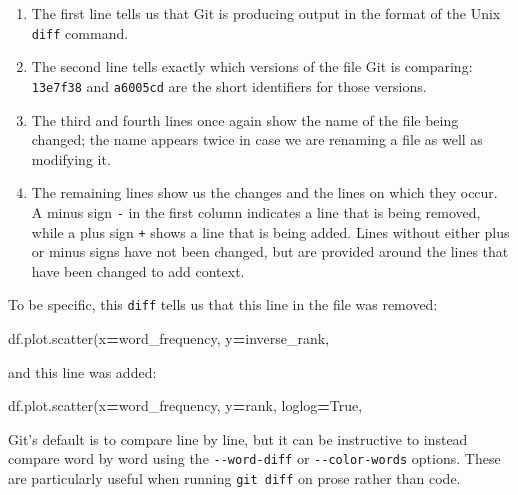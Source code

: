 \documentclass[
]{krantz}
\makeatletter
\newenvironment{Shaded}{\begin{snugshade}}{\end{snugshade}}
\newcommand{\NormalTok}[1]{#1}
\newcommand{\OperatorTok}[1]{\textcolor[rgb]{0.81,0.36,0.00}{\textbf{#1}}}
\newcommand{\StringTok}[1]{\textcolor[rgb]{0.31,0.60,0.02}{#1}}
\newcommand{\VariableTok}[1]{\textcolor[rgb]{0.00,0.00,0.00}{#1}}
\providecommand{\tightlist}{%
  \setlength{\itemsep}{0pt}\setlength{\parskip}{0pt}}
\newenvironment{kframe}{%
\medskip{}
\setlength{\fboxsep}{.8em}
 \def\at@end@of@kframe{}%
 \ifinner\ifhmode%
  \def\at@end@of@kframe{\end{minipage}}%
  \begin{minipage}{\columnwidth}%
 \fi\fi%
 \def\FrameCommand##1{\hskip\@totalleftmargin \hskip-\fboxsep
 \colorbox{shadecolor}{##1}\hskip-\fboxsep
     \hskip-\linewidth \hskip-\@totalleftmargin \hskip\columnwidth}%
 \MakeFramed {\advance\hsize-\width
   \@totalleftmargin\z@ \linewidth\hsize
   \@setminipage}}%
 {\par\unskip\endMakeFramed%
 \at@end@of@kframe}
\renewenvironment{Shaded}{\begin{kframe}}{\end{kframe}}
\makeatother
\begin{document}
\begin{enumerate}
\def\labelenumi{\arabic{enumi}.}
\tightlist
\item
  The first line tells us that Git is producing output
  in the format of the Unix \texttt{diff} command.
\item
  The second line tells exactly which versions of the file Git is comparing:
  \texttt{13e7f38} and \texttt{a6005cd} are the short identifiers for those versions.
\item
  The third and fourth lines once again show the name of the file being changed;
  the name appears twice in case we are renaming a file as well as modifying it.
\item
  The remaining lines show us the changes and the lines on which they occur.
  A minus sign \texttt{-} in the first column indicates a line that is being removed,
  while a plus sign \texttt{+} shows a line that is being added. Lines without either
  plus or minus signs have not been changed, but are provided around the lines
  that have been changed to add context.
\end{enumerate}

To be specific,
this \texttt{diff} tells us that this line in the file was removed:

\begin{Shaded}
\begin{Highlighting}[]
\NormalTok{    df.plot.scatter(x}\OperatorTok{=}\StringTok{\textquotesingle{}word\_frequency\textquotesingle{}}\NormalTok{, y}\OperatorTok{=}\StringTok{\textquotesingle{}inverse\_rank\textquotesingle{}}\NormalTok{,}
\end{Highlighting}
\end{Shaded}

and this line was added:

\begin{Shaded}
\begin{Highlighting}[]
\NormalTok{    df.plot.scatter(x}\OperatorTok{=}\StringTok{\textquotesingle{}word\_frequency\textquotesingle{}}\NormalTok{, y}\OperatorTok{=}\StringTok{\textquotesingle{}rank\textquotesingle{}}\NormalTok{, loglog}\OperatorTok{=}\VariableTok{True}\NormalTok{,}
\end{Highlighting}
\end{Shaded}

Git's default is to compare line by line,
but it can be instructive to instead compare word by word
using the \texttt{-\/-word-diff} or \texttt{-\/-color-words} options.
These are particularly useful when running \texttt{git\ diff} on prose rather than code.
\end{document}
